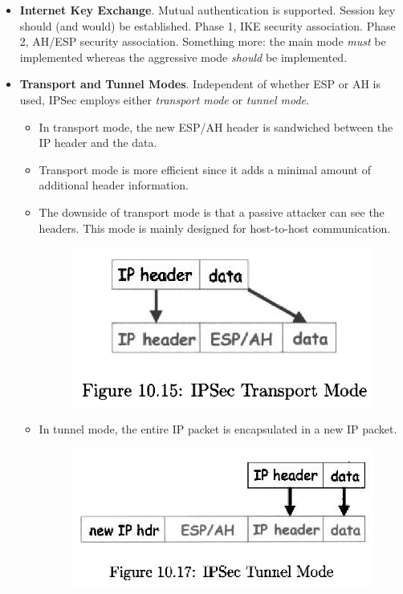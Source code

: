 \documentclass[twocolumn]{article}
\begin{document}
\begin{itemize}
\item \textbf{Internet Key Exchange}. Mutual authentication is
  supported. Session key should (and would) be established. Phase 1,
  IKE security association. Phase 2, AH/ESP security
  association. Something more: the main mode \emph{must} be
  implemented whereas the aggressive mode \emph{should} be
  implemented. 
\item \textbf{Transport and Tunnel Modes}. Independent of whether ESP
  or AH is used, IPSec employs either \emph{transport mode} or
  \emph{tunnel mode}. 
  \begin{itemize}
  \item In transport mode, the new ESP/AH header is sandwiched
    between the IP header and the data.
  \item Transport mode is more efficient since it adds a minimal
    amount of additional header information.
  \item The downside of transport mode is that a passive attacker can
    see the headers. This mode is mainly designed for host-to-host
    communication. 
    \begin{figure}[htbp]
      \centering
      \includegraphics[scale=0.5]{IPSec-Transport-Mode}
    \end{figure}
  \item In tunnel mode,  the entire IP packet is encapsulated in a new
    IP packet. 
    \begin{figure}[htbp]
      \centering
      \includegraphics[scale=0.4]{IPSec-Tunnel-Mode}
    \end{figure}
  \end{itemize}


\end{itemize}
\end{document}
